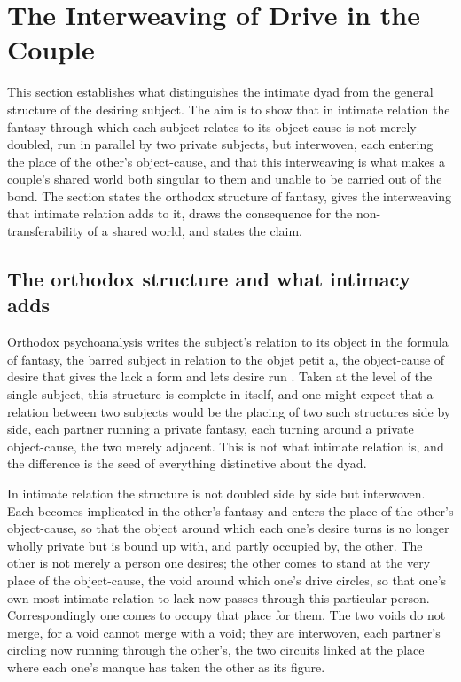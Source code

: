 \section{The Interweaving of Drive in the Couple}
\label{p26:sec:interweaving}

\noindent
This section establishes what distinguishes the intimate dyad from the general structure of the desiring subject. The aim is to show that in intimate relation the fantasy through which each subject relates to its object-cause is not merely doubled, run in parallel by two private subjects, but interwoven, each entering the place of the other's object-cause, and that this interweaving is what makes a couple's shared world both singular to them and unable to be carried out of the bond. The section states the orthodox structure of fantasy, gives the interweaving that intimate relation adds to it, draws the consequence for the non-transferability of a shared world, and states the claim.

\subsection*{The orthodox structure and what intimacy adds}

Orthodox psychoanalysis writes the subject's relation to its object in the formula of fantasy, the barred subject in relation to the objet petit a, the object-cause of desire that gives the lack a form and lets desire run \parencite{lacan1977xi}. Taken at the level of the single subject, this structure is complete in itself, and one might expect that a relation between two subjects would be the placing of two such structures side by side, each partner running a private fantasy, each turning around a private object-cause, the two merely adjacent. This is not what intimate relation is, and the difference is the seed of everything distinctive about the dyad.

In intimate relation the structure is not doubled side by side but interwoven. Each becomes implicated in the other's fantasy and enters the place of the other's object-cause, so that the object around which each one's desire turns is no longer wholly private but is bound up with, and partly occupied by, the other. The other is not merely a person one desires; the other comes to stand at the very place of the object-cause, the void around which one's drive circles, so that one's own most intimate relation to lack now passes through this particular person. Correspondingly one comes to occupy that place for them. The two voids do not merge, for a void cannot merge with a void; they are interwoven, each partner's circling now running through the other's, the two circuits linked at the place where each one's manque has taken the other as its figure.

